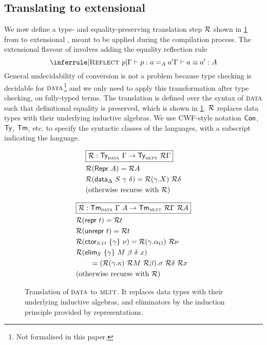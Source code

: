 \subsection{Translating to extensional \langmltt}

We now define a type- and equality-preserving translation step $\mathcal{R}$ shown in \cref{fig:translation} from
\lambdadata to extensional \langmltt, meant to be applied during the
compilation process. The extensional flavour of \lambdamltt involves adding the
equality reflection rule
\[
\inferrule[\axiom{Reflect $p$}]{\Gamma \vdash p : a =_A a'}{\Gamma \vdash a \equiv a' : A}
\]
General undecidability of conversion is not a problem
because type checking is decidable for ${\textsc{data}}$\footnote{Not formalised in
this paper.} and we only need to apply this transformation after type checking,
on fully-typed terms. The translation is defined over the syntax of
${\textsc{data}}$ \cite{Boulier2017-cm} such that definitional equality is
preserved, which is shown in \cref{fig:translation}.
$\mathcal{R}$ replaces data types with their underlying inductive algebras. We use
CWF-style notation $\textsf{Con}$, $\textsf{Ty}$, $\textsf{Tm}$, etc. to specify the syntactic classes
of the languages, with a subscript indicating the language.

\begin{figure}
\begin{minipage}[t]{0.5\textwidth}
\begin{align*}
&\boxed{\mathcal{R} : \textsf{Ty}_{{\textsc{data}}}\ \Gamma \to \textsf{Ty}_{{\textsc{mltt}}}\ \mathcal{R} \Gamma} \\
&\mathcal{R} (\textsf{Repr}\ A) = \mathcal{R} A \\
&\mathcal{R} (\textsf{data}_{\Delta}\ S\ \gamma\ \delta) = \mathcal{R} (\gamma.X)\ \mathcal{R} \delta \\
&\text{(otherwise recurse with $\mathcal{R}$)}
\end{align*}
\end{minipage}%
\begin{minipage}[t]{0.5\textwidth}
\begin{align*}
&\boxed{\mathcal{R} : \textsf{Tm}_{{\textsc{data}}}\ \Gamma\ A \to \textsf{Tm}_{{\textsc{mltt}}}\ \mathcal{R} \Gamma\ \mathcal{R} A} \\
&\mathcal{R} (\textsf{repr}\ t) = \mathcal{R} t \\
&\mathcal{R} (\textsf{unrepr}\ t) = \mathcal{R} t \\
&\mathcal{R} (\textsf{ctor}_{S.O}\ \{\gamma\}\ \nu) = \mathcal{R} (\gamma.\alpha_O)\ \mathcal{R}\nu \\
&\mathcal{R} (\textsf{elim}_{S}\ \{\gamma\}\ M\ \beta\ \delta\ x)  \\ &\qquad = (\mathcal{R} (\gamma.\kappa)\ \mathcal{R} M\ \mathcal{R} \beta).\sigma\ \mathcal{R}\delta\ \mathcal{R} x \\
&\text{(otherwise recurse with $\mathcal{R}$)}
\end{align*}
\end{minipage}
\caption{Translation of ${\textsc{data}}$ to ${\textsc{mltt}}$. It replaces data types
with their underlying inductive algebras, and eliminators by the induction
principle provided by representations.}
\label{fig:translation}
\end{figure}

